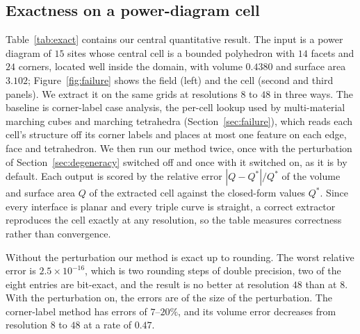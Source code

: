 \documentclass{egpubl}
\theoremstyle{definition}
\begin{document}
\subsection{Exactness on a power-diagram cell}

Table~\ref{tab:exact} contains our central quantitative result. The input is
a power diagram of $15$ sites whose central cell is a bounded polyhedron with
$14$ facets and $24$ corners, located well inside the domain, with volume
$0.4380$ and surface area $3.102$; Figure~\ref{fig:failure} shows the field
(left) and the cell (second and third panels). We extract it on
the same grids at resolutions $8$ to $48$ in three ways. The baseline is corner-label case analysis, the per-cell
lookup used by multi-material marching cubes and marching tetrahedra
(Section~\ref{sec:failure}), which reads each cell's structure off its corner
labels and places at most one feature on each edge, face and tetrahedron. We
then run our method twice, once with the
perturbation of Section~\ref{sec:degeneracy} switched off and once with it
switched on, as it is by default. Each output is scored by the relative error $|Q - Q^\ast|/Q^\ast$ of the
volume and surface area $Q$ of the extracted cell against the closed-form values
$Q^\ast$. Since
every interface is planar and every triple curve is straight, a correct
extractor reproduces the cell exactly at any resolution, so the table measures
correctness rather than convergence.

Without the perturbation our method is exact up to rounding. The worst relative error
is $2.5\times10^{-16}$, which is two rounding steps of double precision, two of
the eight entries are bit-exact, and the result
is no better at resolution $48$ than at $8$. With the perturbation on, the
errors are of the size of the perturbation. The corner-label method has
errors of $7$--$20\%$, and its volume error decreases from resolution $8$ to
$48$ at a rate of $0.47$.
\end{document}
